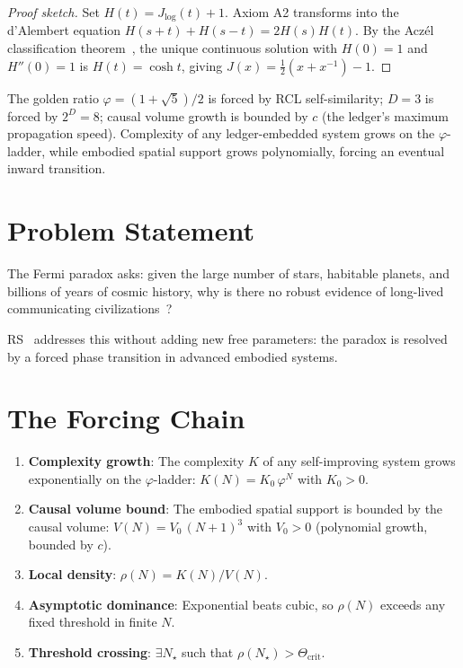 \documentclass[12pt,a4paper]{article}
\theoremstyle{definition}
\theoremstyle{remark}
\begin{document}
\begin{proof}[Proof sketch]
Set $H(t) = J_{\log}(t)+1$.  Axiom A2 transforms into the d'Alembert
equation $H(s+t)+H(s-t)=2H(s)H(t)$.  By the Acz\'el classification
theorem~\cite{Aczel1966}, the unique continuous solution with $H(0)=1$
and $H''(0)=1$ is $H(t)=\cosh t$, giving
$J(x)=\tfrac{1}{2}(x+x^{-1})-1$.
\end{proof}

\noindent The golden ratio $\varphi=(1+\sqrt{5})/2$ is forced by RCL
self-similarity; $D=3$ is forced by $2^D=8$; causal volume growth
is bounded by $c$ (the ledger's maximum propagation speed).  Complexity
of any ledger-embedded system grows on the $\varphi$-ladder, while
embodied spatial support grows polynomially, forcing an eventual
inward transition.

\section{Problem Statement}
\label{sec:problem}

The Fermi paradox asks: given the large number of stars, habitable
planets, and billions of years of cosmic history, why is there no
robust evidence of long-lived communicating
civilizations~\cite{Drake}?

RS~\cite{RS_Axioms} addresses this without adding new free parameters:
the paradox is resolved by a forced phase transition in advanced
embodied systems.

\section{The Forcing Chain}
\label{sec:forcing}

\begin{enumerate}
  \item \textbf{Complexity growth}: The complexity $K$ of any
  self-improving system grows exponentially on the $\varphi$-ladder:
  $K(N) = K_0\,\varphi^N$ with $K_0 > 0$.
  \item \textbf{Causal volume bound}: The embodied spatial support is
  bounded by the causal volume: $V(N) = V_0\,(N+1)^3$ with $V_0 > 0$
  (polynomial growth, bounded by $c$).
  \item \textbf{Local density}: $\rho(N) = K(N)/V(N)$.
  \item \textbf{Asymptotic dominance}: Exponential beats cubic, so
  $\rho(N)$ exceeds any fixed threshold in finite $N$.
  \item \textbf{Threshold crossing}: $\exists N_\star$ such that
  $\rho(N_\star) > \Theta_{\mathrm{crit}}$.
\end{enumerate}
\end{document}
